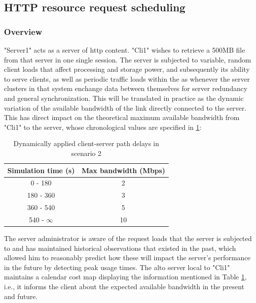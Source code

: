 \subsection{HTTP resource request scheduling}

\label{ssec:scenario2}

\subsubsection{Overview}

    "Server1" acts as a server of \gls{http} content.
    "Cli1" wishes to retrieve a 500MB file from that server in one single session.
    The server is subjected to variable, random client loads that affect processing and storage power, and subsequently its ability to serve clients, as well as periodic traffic loads within the \gls{as} whenever the server clusters in that system enchange data between themselves for server redundancy and general synchronization.
    This will be translated in practice as the dynamic variation of the available bandwidth of the link directly connected to the server.
    This has direct impact on the theoretical maximum available bandwidth from "Cli1" to the server, whose chronological values are specified in \ref{table:server-delays}:

\begin{table}[H]
\centering
\begin{tabular}{|c|c|}
    \hline
    \textbf{Simulation time (s)}  & \textbf{Max bandwidth (Mbps)}  \\ \hline
    0 - 180            & 2                                         \\ \hline
    180 - 360          & 3                                         \\ \hline
    360 - 540          & 5                                         \\ \hline
    540 - $\infty$     & 10                                        \\ \hline
\end{tabular}
\caption{Dynamically applied client-server path delays in scenario 2}
\label{table:server-delays}
\end{table}

    The server administrator is aware of the request loads that the server is subjected to and has maintained historical observations that existed in the past, which allowed him to reasonably predict how these will impact the server's performance in the future by detecting peak usage times.
    The \gls{alto} server local to "Cli1" maintains a calendar cost map displaying the information mentioned in Table \ref{table:server-delays}, i.e., it informs the client about the expected available bandwidth in the present and future.

